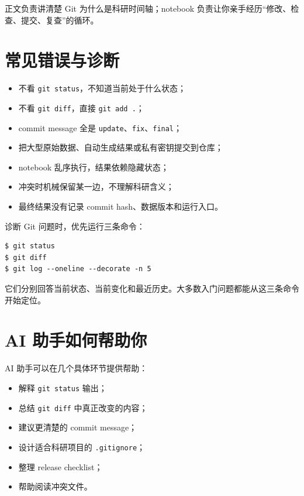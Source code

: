 正文负责讲清楚 Git 为什么是科研时间轴；notebook 负责让你亲手经历“修改、检查、提交、复查”的循环。

\section{常见错误与诊断}

\begin{warnbox}
\begin{itemize}
    \item 不看 \texttt{git status}，不知道当前处于什么状态；
    \item 不看 \texttt{git diff}，直接 \texttt{git add .}；
    \item commit message 全是 \texttt{update}、\texttt{fix}、\texttt{final}；
    \item 把大型原始数据、自动生成结果或私有密钥提交到仓库；
    \item notebook 乱序执行，结果依赖隐藏状态；
    \item 冲突时机械保留某一边，不理解科研含义；
    \item 最终结果没有记录 commit hash、数据版本和运行入口。
\end{itemize}
\end{warnbox}

诊断 Git 问题时，优先运行三条命令：

\begin{lstlisting}[style=terminal]
$ git status
$ git diff
$ git log --oneline --decorate -n 5
\end{lstlisting}

它们分别回答当前状态、当前变化和最近历史。大多数入门问题都能从这三条命令开始定位。

\section{AI 助手如何帮助你}

AI 助手可以在几个具体环节提供帮助：

\begin{itemize}
    \item 解释 \texttt{git status} 输出；
    \item 总结 \texttt{git diff} 中真正改变的内容；
    \item 建议更清楚的 commit message；
    \item 设计适合科研项目的 \texttt{.gitignore}；
    \item 整理 release checklist；
    \item 帮助阅读冲突文件。
\end{itemize}

